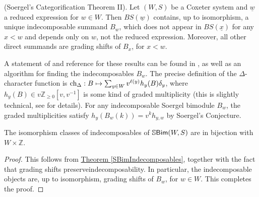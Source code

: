\noindent\begin{theorem}\textup{(Soergel's Categorification Theorem II).}\label{SBimIndecomposables} Let $(W, S)$ be a Coxeter system and $\underline{w}$ a reduced expression for $w \in W$. Then $BS(\underline{w})$ contains, up to isomorphism, a unique indecomposable summand $B_w$, which does not appear in $BS(\underline{x})$ for any $x < w$ and depends only on $w$, not the reduced expression. Moreover, all other direct summands are grading shifts of $B_x$, for $x < w$.\newpage
\end{theorem}

\noindent A statement of and reference for these results can be found in \cite[Theorem 5.24]{EMTW20}, as well as an algorithm for finding the indecomposables $B_w$. The precise definition of the $\Delta$-character function is $\textup{ch}_\Delta : B \mapsto \sum_{y \in W} v^{\ell(y)} h_y(B) \delta_y$, where $h_y(B) \in v\mathbb{Z}_{\geq 0}[v, v^{-1}]$ is some kind of graded multiplicity (this is slightly technical, see \cite[Theorem 5.10]{EMTW20} for details). For any indecomposable Soergel bimodule $B_w$, the graded multiplicities satisfy $h_y(B_w(k)) = v^k h_{y, w}$ by Soergel's Conjecture.\\

\noindent\begin{corollary}\label{SBimIndecomposablesCardinality} The isomorphism classes of indecomposables of $\mathbb{S}\textup{\textsf{Bim}}(W, S)$ are in bijection with $W \times \mathbb{Z}$.\\
\end{corollary}

\noindent\begin{proof} This follows from \hyperref[SBimIndecomposables]{Theorem \ref*{SBimIndecomposables}}, together with the fact that grading shifts preserve\linebreak indecomposability. In particular, the indecomposable objects are, up to isomorphism, grading shifts of $B_w$, for $w \in W$. This completes the proof.
\end{proof}\\


